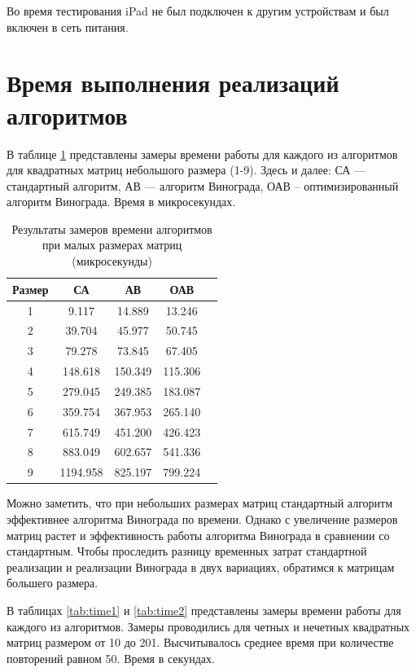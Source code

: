 Во время тестирования iPad не был подключен к другим устройствам и был включен в сеть питания.

\section{Время выполнения реализаций алгоритмов}

В таблице \ref{tab:time0} представлены замеры времени работы для каждого из алгоритмов для квадратных матриц небольшого размера (1-9). Здесь и далее: СА — стандартный алгоритм, АВ — алгоритм Винограда, ОАВ -- оптимизированный алгоритм Винограда. Время в микросекундах.

\begin{table}[h]
	\begin{center}
		\caption{\label{tab:time0}Результаты замеров времени алгоритмов при малых размерах матриц (микросекунды)}
		\begin{tabular}{|c|c|c|c|c|}
		\hline
		Размер & СА &  АВ & ОАВ \\
		\hline
		1  & 9.117 & 14.889 & 13.246\\
		\hline
		2  & 39.704 & 45.977 & 50.745\\
		\hline
		3  & 79.278 & 73.845 & 67.405 \\
		\hline
		4  & 148.618 & 150.349 & 115.306 \\
		\hline
		5  & 279.045 & 249.385 & 183.087 \\
		\hline
		6  & 359.754 & 367.953 & 265.140 \\
		\hline
		7  & 615.749 & 451.200 & 426.423 \\
		\hline
		8  & 883.049 & 602.657 & 541.336 \\
		\hline
		9  & 1194.958 & 825.197 & 799.224 \\
		\hline
		
		\end{tabular}
	\end{center}
\end{table}

Можно заметить, что при небольших размерах матриц стандартный алгоритм эффективнее алгоритма Винограда по времени. Однако с увеличение размеров матриц растет и эффективность работы алгоритма Винограда в сравнении со стандартным. Чтобы проследить разницу временных затрат стандартной реализации и реализации Винограда в двух вариациях, обратимся к матрицам большего размера. 

В таблицах \ref{tab:time1} и \ref{tab:time2} представлены замеры времени работы для каждого из алгоритмов. 
Замеры проводились для четных и нечетных квадратных матриц размером от 10 до 201. Высчитывалось среднее время при количестве повторений равном 50. Время в секундах.

